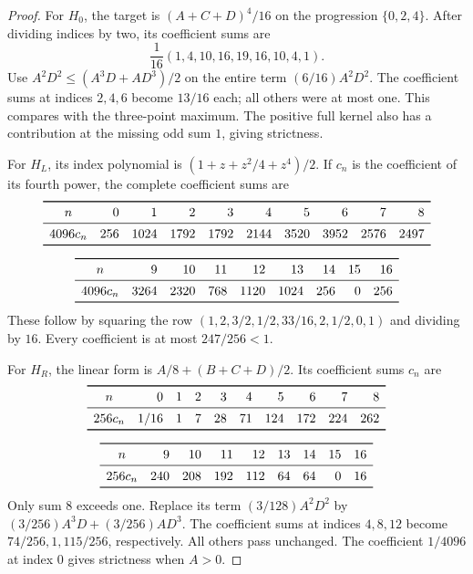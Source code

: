 \begin{proof}
For $H_0$, the target is $(A+C+D)^4/16$ on the progression
$\{0,2,4\}$. After dividing indices by two, its coefficient sums are
\[
\frac1{16}(1,4,10,16,19,16,10,4,1).
\]
Use $A^2D^2\leq(A^3D+AD^3)/2$ on the entire term
$(6/16)A^2D^2$. The coefficient sums at indices $2,4,6$ become
$13/16$ each; all others were at most one. This compares with the
three-point maximum. The positive full kernel also has a contribution
at the missing odd sum $1$, giving strictness.

For $H_L$, its index polynomial is
$(1+z+z^2/4+z^4)/2$. If $c_n$ is the coefficient of its fourth power,
the complete coefficient sums are
\begin{equation}\label{d-HL-coefficients}
\begin{gathered}
\begin{array}{c rrrrrrrrr}
\toprule
n&0&1&2&3&4&5&6&7&8\\
\midrule
4096c_n&256&1024&1792&1792&2144&3520&3952&2576&2497\\
\bottomrule
\end{array}\\[6pt]
\begin{array}{c rrrrrrrr}
\toprule
n&9&10&11&12&13&14&15&16\\
\midrule
4096c_n&3264&2320&768&1120&1024&256&0&256\\
\bottomrule
\end{array}
\end{gathered}
\end{equation}
These follow by squaring the row
$(1,2,3/2,1/2,33/16,2,1/2,0,1)$ and dividing by $16$.
Every coefficient is at most $247/256<1$.

For $H_R$, the linear form is $A/8+(B+C+D)/2$. Its coefficient
sums $c_n$ are
\begin{equation}\label{d-HR-coefficients}
\begin{gathered}
\begin{array}{c rrrrrrrrr}
\toprule
n&0&1&2&3&4&5&6&7&8\\
\midrule
256c_n&1/16&1&7&28&71&124&172&224&262\\
\bottomrule
\end{array}\\[6pt]
\begin{array}{c rrrrrrrr}
\toprule
n&9&10&11&12&13&14&15&16\\
\midrule
256c_n&240&208&192&112&64&64&0&16\\
\bottomrule
\end{array}
\end{gathered}
\end{equation}
Only sum $8$ exceeds one. Replace its term $(3/128)A^2D^2$ by
$(3/256)A^3D+(3/256)AD^3$. The coefficient sums at indices $4,8,12$
become $74/256,1,115/256$, respectively. All others pass unchanged.
The coefficient $1/4096$ at index $0$ gives strictness when $A>0$.


\end{proof}

